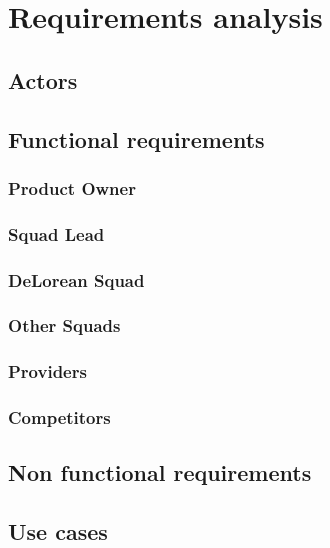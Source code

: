 
\chapter{Requirements analysis}

\label{chapter04}

\section{Actors}

\section{Functional requirements}

\subsection{Product Owner}

\subsection{Squad Lead}

\subsection{DeLorean Squad}

\subsection{Other Squads}

\subsection{Providers}

\subsection{Competitors}

\section{Non functional requirements}

\section{Use cases}

